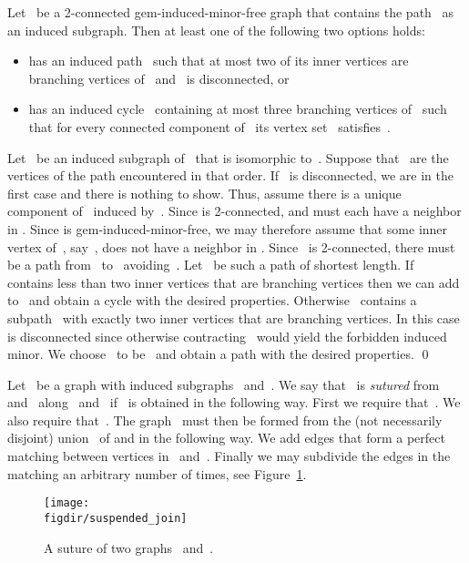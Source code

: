 \documentclass[envcountsame,envcountsect,11pt,a4paper]{llncs}
\renewenvironment{proof}{\begin{Proof}}{\qed\end{Proof}}
\newcommand{\figdir}{.}
\begin{document}
\begin{lemma}
\label{lem:P4:or:cycle}
Let~ be a 2-connected gem-induced-minor-free graph that contains the path~ as an induced subgraph. Then at least one of the following two options holds:
\begin{itemize}
\item  has an induced path~ such that at most two of its inner vertices are branching vertices of~ and~ is disconnected, or 
\item  has an induced cycle~ containing at most three branching vertices of~ such that for every connected component of~ its vertex set~ satisfies~.
\end{itemize}
\end{lemma}
\begin{proof}
Let~ be an induced subgraph of~ that is isomorphic to~. Suppose that~ are the vertices of the path encountered in that order.
If~ is disconnected, we are in the first case and there is nothing to show.
Thus, assume there is a unique component of~ induced by~.
Since  is 2-connected,  and  must each have a neighbor in .
Since  is gem-induced-minor-free, we may therefore assume that some inner vertex of~, say~, does not have a neighbor in .
Since~ is 2-connected, there must be a path from~ to~ avoiding~. Let~ be such a path of shortest length. If~
contains less than two inner vertices that are branching vertices then we can add~ to~ and obtain a cycle with the desired properties.
Otherwise~ contains a subpath~ with exactly two inner vertices that are branching vertices.
In this case~ is disconnected since otherwise contracting~ would yield the forbidden
induced minor. We choose~ to be~ and obtain a path with the desired properties.
\end{proof}


Let~ be a graph with induced subgraphs~ and~. We say that~ is \emph{sutured} from~ and~ along~ and~ if~ is obtained in the following way. First we require that~.
We also require that~.
The graph~ must then be formed from the (not necessarily disjoint) union~ of  and  in the following way.
We add edges that form a perfect matching between vertices in~ and~. Finally we may subdivide the edges in
the matching an arbitrary number of times, see Figure~\ref{fig:suture}.

\begin{figure}[htb]
  \centering
  \texttt{[image: \\figdir/suspended\_join]}
  \caption{A suture of two graphs~ and~.}
  \label{fig:suture}
\end{figure}
\end{document}
